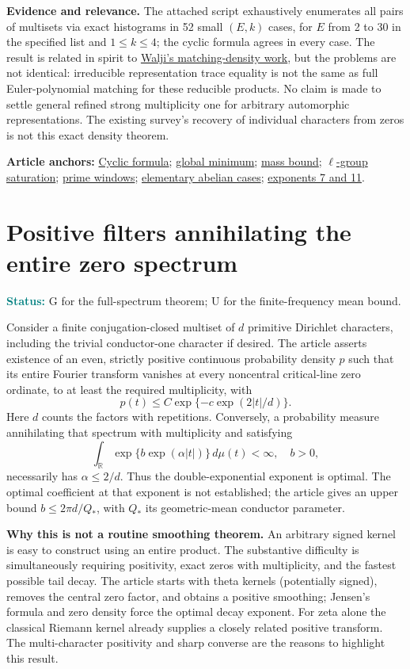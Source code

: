 \documentclass[11pt]{article}
\newcommand{\art}[3]{\href{https://github.com/VladimirReshetnikov/ProveIt/blob/3c4d27a69c98d09319a51e41a19fca05bb80a3e2/Analysis/GeneralizedRiemannHypothesis/Article/sections/#1.tex\#L#2}{#3}}
\newcommand{\status}[1]{\par\smallskip\noindent\textcolor{teal}{\textbf{Status:}} #1\par\smallskip}
\newcommand{\sources}[1]{\par\smallskip\noindent\textbf{Article anchors:} #1\par}
\newcommand{\R}{\mathbb R}
\begin{document}
\textbf{Evidence and relevance.} The attached script exhaustively enumerates all pairs of multisets via exact histograms in 52 small $(E,k)$ cases, for $E$ from 2 to 30 in the specified list and $1\le k\le4$; the cyclic formula agrees in every case. The result is related in spirit to \href{https://arxiv.org/abs/1501.07343}{Walji's matching-density work}, but the problems are not identical: irreducible representation trace equality is not the same as full Euler-polynomial matching for these reducible products. No claim is made to settle general refined strong multiplicity one for arbitrary automorphic representations. The existing survey's recovery of individual characters from zeros is not this exact density theorem.
\sources{\art{rec}{4713}{Cyclic formula}; \art{rec}{4759}{global minimum}; \art{rec}{4797}{mass bound}; \art{rec}{4825}{$\ell$-group saturation}; \art{rec}{4895}{prime windows}; \art{rec}{5001}{elementary abelian cases}; \art{rec}{5484}{exponents 7 and 11}.}
\clearpage
\section{Positive filters annihilating the entire zero spectrum}
\status{G for the full-spectrum theorem; U for the finite-frequency mean bound.}
Consider a finite conjugation-closed multiset of $d$ primitive Dirichlet characters, including the trivial conductor-one character if desired. The article asserts existence of an even, strictly positive continuous probability density $p$ such that its entire Fourier transform vanishes at every noncentral critical-line zero ordinate, to at least the required multiplicity, with
\[
 p(t)\le C\exp\{-c\exp(2|t|/d)\}.
\]
Here $d$ counts the factors with repetitions. Conversely, a probability measure annihilating that spectrum with multiplicity and satisfying
\[
\int_{\R}\exp\{b\exp(\alpha|t|)\}\,d\mu(t)<\infty,\quad b>0,
\]
necessarily has $\alpha\le2/d$. Thus the double-exponential exponent is optimal. The optimal coefficient at that exponent is not established; the article gives an upper bound $b\le2\pi d/Q_*$, with $Q_*$ its geometric-mean conductor parameter.

\textbf{Why this is not a routine smoothing theorem.} An arbitrary signed kernel is easy to construct using an entire product. The substantive difficulty is simultaneously requiring positivity, exact zeros with multiplicity, and the fastest possible tail decay. The article starts with theta kernels (potentially signed), removes the central zero factor, and obtains a positive smoothing; Jensen's formula and zero density force the optimal decay exponent. For zeta alone the classical Riemann kernel already supplies a closely related positive transform. The multi-character positivity and sharp converse are the reasons to highlight this result.
\end{document}
